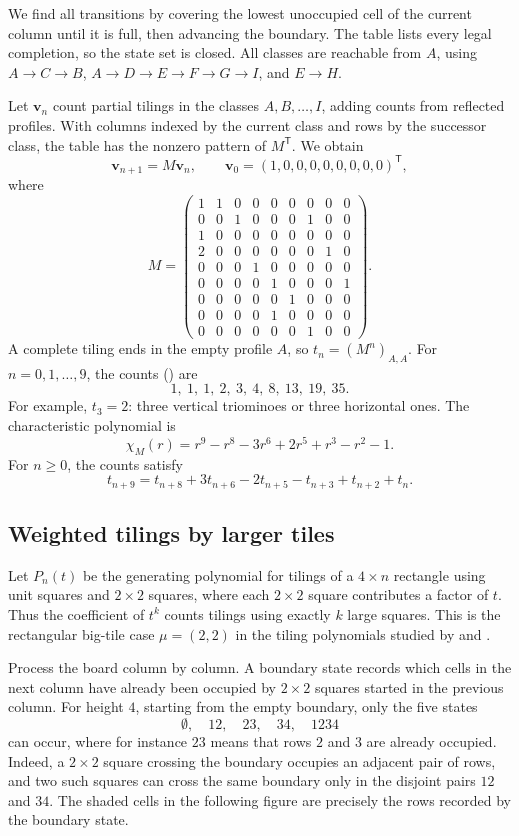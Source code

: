 We find all transitions by covering the lowest unoccupied cell of the current
column until it is full, then advancing the boundary. The table lists every
legal completion, so the state set is closed. All classes are reachable
from $A$, using $A\to C\to B$, $A\to D\to E\to F\to G\to I$,
and $E\to H$.

Let $\mathbf v_n$ count partial tilings in the classes $A,B,\dotsc,I$,
adding counts from reflected profiles. With columns indexed by the current
class and rows by the successor class, the table has the nonzero pattern
of $M^{\mathsf T}$. We obtain
\[
\mathbf v_{n+1}=M\mathbf v_n,
\qquad
\mathbf v_0=(1,0,0,0,0,0,0,0,0)^{\mathsf T},
\]
where
\[
M=
\begin{pmatrix}
1&1&0&0&0&0&0&0&0\\
0&0&1&0&0&0&1&0&0\\
1&0&0&0&0&0&0&0&0\\
2&0&0&0&0&0&0&1&0\\
0&0&0&1&0&0&0&0&0\\
0&0&0&0&1&0&0&0&1\\
0&0&0&0&0&1&0&0&0\\
0&0&0&0&1&0&0&0&0\\
0&0&0&0&0&0&1&0&0
\end{pmatrix}.
\]
A complete tiling ends in the empty profile $A$, so $t_n=(M^n)_{A,A}$.
For $n=0,1,\dotsc,9$, the counts () are
\[
1,\ 1,\ 1,\ 2,\ 3,\ 4,\ 8,\ 13,\ 19,\ 35.
\]
For example, $t_3=2$: three vertical triominoes or three horizontal ones.
The characteristic polynomial is
\[
\chi_M(r)=r^9-r^8-3r^6+2r^5+r^3-r^2-1.
\]
For $n\geq0$, the counts satisfy
\[
t_{n+9}=t_{n+8}+3t_{n+6}-2t_{n+5}-t_{n+3}+t_{n+2}+t_n.
\]


\subsection[transferMatrixWeightedTilings]{Weighted tilings by larger tiles}

Let $P_n(t)$ be the generating polynomial for tilings of a $4\times n$
rectangle using unit squares and $2\times 2$ squares, where each $2\times 2$
square contributes a factor of $t$. Thus the coefficient of $t^k$ counts
tilings using exactly $k$ large squares.
This is the rectangular big-tile case $\mu=(2,2)$ in the tiling polynomials
studied by  and 
\cite{AhlbergAlexandersson2026}.

Process the board column by column. A boundary state records which cells in
the next column have already been occupied by $2\times 2$ squares started in
the previous column. For height $4$, starting from the empty boundary, only
the five states
\[
  \emptyset,\quad 12,\quad 23,\quad 34,\quad 1234
\]
can occur, where for instance $23$ means that rows $2$ and $3$ are already
occupied.
Indeed, a $2\times2$ square crossing the boundary occupies an adjacent pair
of rows, and two such squares can cross the same boundary only in the disjoint
pairs $12$ and $34$.  The shaded cells in the following figure are precisely
the rows recorded by the boundary state.

